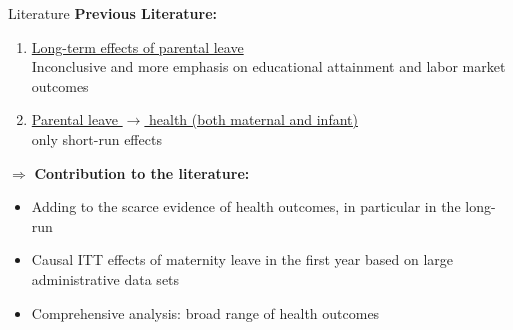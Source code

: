 \documentclass[handout]{beamer} %
\begin{document}
\begin{frame}{Literature}
\textbf{Previous Literature:}
\begin{enumerate}
\item \underline{Long-term effects of parental leave}\\ Inconclusive and more emphasis on educational attainment and labor market outcomes
\item \underline{Parental leave $\rightarrow$ health (both maternal and infant)} \\only short-run effects
\end{enumerate}\pause
\bigskip
$\Rightarrow$ \textbf{Contribution to the literature:}
\begin{itemize}
\item Adding to the scarce evidence of health outcomes, in particular in the long-run

\item Causal ITT effects of maternity leave in the first year based on large administrative data sets

\item Comprehensive analysis: broad range of health outcomes 



\end{itemize}
\end{frame}



\end{document}

